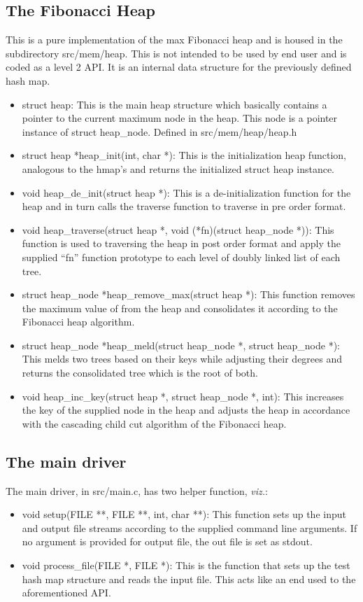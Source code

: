 \documentclass[conference,a4paper,12pt]{IEEEtran}
\begin{document}
	\subsection{The Fibonacci Heap}
	This is a pure implementation of the max Fibonacci heap and is housed in the subdirectory src/mem/heap. This is not intended to be used by end user and is coded as a level 2 API. It is an internal data structure for the previously defined hash map.
	\begin{itemize}
	\item{struct heap:}
	This is the main heap structure which basically contains a pointer to the current maximum node in the heap. This node is a pointer instance of struct heap\_node. Defined in src/mem/heap/heap.h
	\item{struct heap *heap\_init(int, char *):}
	This is the initialization heap function, analogous to the hmap's and returns the initialized struct heap instance.
	\item{void heap\_de\_init(struct heap *):}
	This is a de-initialization function for the heap and in turn calls the traverse function to traverse in pre order format.
	\item{void heap\_traverse(struct heap *, void (*fn)(struct heap\_node *)):}
	This function is used to traversing the heap in post order format and apply the supplied ``fn'' function prototype to each level of doubly linked list of each tree.
	\item{struct heap\_node *heap\_remove\_max(struct heap *):}
	This function removes the maximum value of from the heap and consolidates it according to the Fibonacci heap algorithm.
	\item{struct heap\_node *heap\_meld(struct heap\_node *, struct heap\_node *):}
	This melds two trees based on their keys while adjusting their degrees and returns the consolidated tree which is the root of both.
	\item{void heap\_inc\_key(struct heap *, struct heap\_node *, int):}
	This increases the key of the supplied node in the heap and adjusts the heap in accordance with the cascading child cut algorithm of the Fibonacci heap.
	\end{itemize}
	
	\subsection{The main driver}
	The main driver, in src/main.c, has two helper function, \textit{viz.}:
	\begin{itemize}
	\item{void setup(FILE **, FILE **, int, char **):}
	This function sets up the input and output file streams according to the supplied command line arguments. If no argument is provided for output file, the out file is set as stdout.
	\item{void process\_file(FILE *, FILE *):}
	This is the function that sets up the test hash map structure and reads the input file. This acts like an end used to the aforementioned API. 
	\end{itemize}
\end{document}
